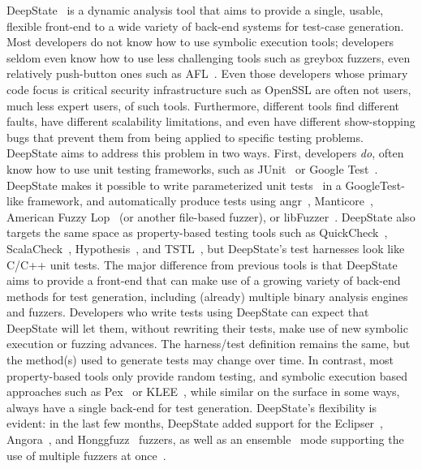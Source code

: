 DeepState~\cite{DeepState} is a dynamic analysis tool that aims to provide a single, usable, flexible front-end to a wide variety of back-end systems for test-case generation.  Most developers do not know how to use symbolic execution tools; developers seldom even know how to use less challenging tools such as greybox fuzzers, even relatively push-button ones such as AFL~\cite{aflfuzz}.  Even those developers whose primary code focus is critical security infrastructure such as OpenSSL are often not users, much less expert users, of such tools.  Furthermore, different tools find different faults, have different scalability limitations, and even have different show-stopping bugs that prevent them from being applied to specific testing problems.  DeepState aims to address this problem in two ways.  First, developers \emph{do}, often know how to use unit testing frameworks, such as JUnit~\cite{JUnit} or Google Test~\cite{GoogleTest}. DeepState makes it possible to write parameterized unit tests~\cite{ParamUnit} in a GoogleTest-like framework, and automatically produce tests using angr~\cite{angr1,angr2,angr3}, Manticore~\cite{Manticore}, American Fuzzy Lop~\cite{aflfuzz} (or another file-based fuzzer), or libFuzzer~\cite{libFuzzer}.  DeepState also targets the same space as property-based testing tools such as QuickCheck~\cite{ClaessenH00}, ScalaCheck~\cite{ScalaCheckDoc}, Hypothesis~\cite{Hypothesis}, and TSTL~\cite{NFM15,tstlsttt}, but DeepState's test harnesses look like C/C++ unit tests. The major difference from previous tools is that DeepState aims to provide a front-end that can make use of a growing variety of back-end methods for test generation, including (already) multiple binary analysis engines and fuzzers.  Developers who write tests using DeepState can expect that DeepState will let them, without rewriting their tests, make use of new symbolic execution or fuzzing advances.  The harness/test definition remains the same, but the method(s) used to generate tests may change over time.  In contrast, most property-based tools only provide random testing, and symbolic execution based approaches such as Pex~\cite{Pex,UnitMeister} or KLEE~\cite{KLEE}, while similar on the surface in some ways, always have a single back-end for test generation. DeepState's flexibility is evident: in the last few months, DeepState added support for the Eclipser~\cite{eclipser}, Angora~\cite{angora}, and Honggfuzz~\cite{Honggfuzz} fuzzers, as well as an ensemble~\cite{enfuzz} mode  supporting  the use  of multiple fuzzers at once~\cite{ensemble}.

